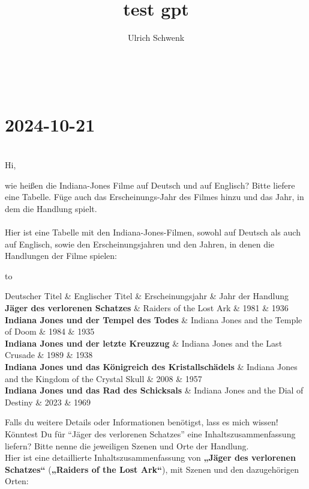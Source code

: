 \documentclass[a4paper]{article}
\author{Ulrich Schwenk}
\title{test gpt}
\begin{document}
\setlength{\tabulinesep}{6pt}
\maketitle
\newpage

\begin{dialogue}
 \leavevmode\\
\end{dialogue}




\section*{2024-10-21}
\begin{dialogue}
 \leavevmode\\
Hi,

wie heißen die Indiana-Jones Filme auf Deutsch und auf Englisch? Bitte liefere eine Tabelle. Füge auch das Erscheinungs-Jahr des Filmes hinzu und das Jahr, in dem die Handlung spielt.
 \leavevmode\\
 \leavevmode\\
Hier ist eine Tabelle mit den Indiana-Jones-Filmen, sowohl auf Deutsch als auch auf Englisch, sowie den Erscheinungsjahren und den Jahren, in denen die Handlungen der Filme spielen:

\begin{table}[h]
\centering
\small
\begin{tabu} to \linewidth { |X[m,c]|X[m,c]|X[m,c]|X[m,c]| }

\hline
Deutscher Titel & Englischer Titel & Erscheinungsjahr & Jahr der Handlung\\\hline 
\hline
\textbf{Jäger des verlorenen Schatzes} & Raiders of the Lost Ark & 1981 & 1936\\\hline 
\textbf{Indiana Jones und der Tempel des Todes} & Indiana Jones and the Temple of Doom & 1984 & 1935\\\hline 
\textbf{Indiana Jones und der letzte Kreuzzug} & Indiana Jones and the Last Crusade & 1989 & 1938\\\hline 
\textbf{Indiana Jones und das Königreich des Kristallschädels} & Indiana Jones and the Kingdom of the Crystal Skull & 2008 & 1957\\\hline 
\textbf{Indiana Jones und das Rad des Schicksals} & Indiana Jones and the Dial of Destiny & 2023 & 1969\\\hline 
\end{tabu}
\end{table}

Falls du weitere Details oder Informationen benötigst, lass es mich wissen!
 \leavevmode\\
Könntest Du für "`Jäger des verlorenen Schatzes"' eine Inhaltszusammenfassung liefern? Bitte nenne die jeweiligen Szenen und Orte der Handlung.
 \leavevmode\\
Hier ist eine detaillierte Inhaltszusammenfassung von \textbf{„Jäger des verlorenen Schatzes“} (\textbf{„Raiders of the Lost Ark“}), mit Szenen und den dazugehörigen Orten:
\end{dialogue}
\end{document}
